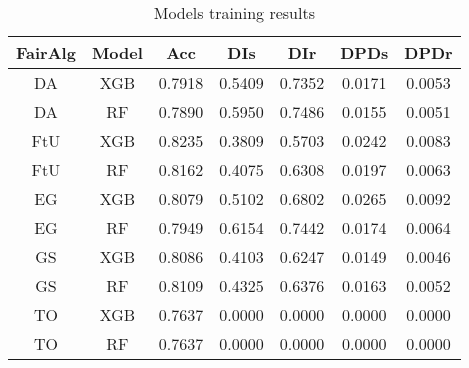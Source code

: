 \begin{table}%
    \centering
    \begin{tabular}{|c|c|c|c|c|c|c|}
        \hline
        \textbf{FairAlg} & \textbf{Model} & \textbf{Acc} & \textbf{DIs} & \textbf{DIr} & \textbf{DPDs} & \textbf{DPDr} \\
        \hline
        DA & XGB & 0.7918 & 0.5409 & 0.7352 & 0.0171 & 0.0053 \\
        DA & RF & 0.7890 & 0.5950 & 0.7486 & 0.0155 & 0.0051 \\
        FtU & XGB & 0.8235 & 0.3809 & 0.5703 & 0.0242 & 0.0083 \\
        FtU & RF & 0.8162 & 0.4075 & 0.6308 & 0.0197 & 0.0063 \\
        EG & XGB & 0.8079 & 0.5102 & 0.6802 & 0.0265 & 0.0092 \\
        EG & RF & 0.7949 & 0.6154 & 0.7442 & 0.0174 & 0.0064 \\
        GS & XGB & 0.8086 & 0.4103 & 0.6247 & 0.0149 & 0.0046 \\
        GS & RF & 0.8109 & 0.4325 & 0.6376 & 0.0163 & 0.0052 \\
        TO & XGB & 0.7637 & 0.0000 & 0.0000 & 0.0000 & 0.0000 \\
        TO & RF & 0.7637 & 0.0000 & 0.0000 & 0.0000 & 0.0000 \\
        \hline
    \end{tabular}
    \caption{Models training results}
    \label{fig:results}
\end{table}


